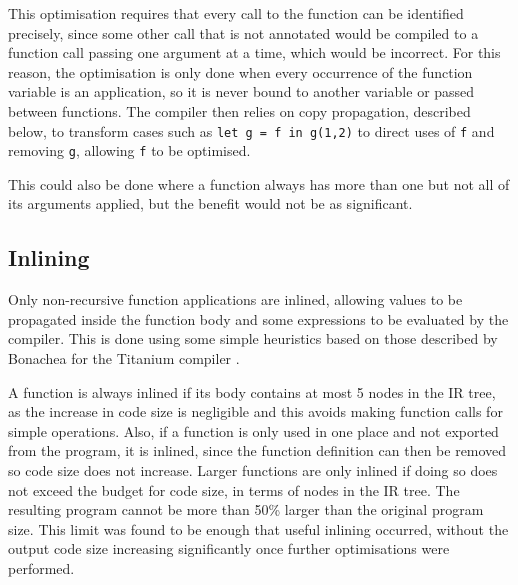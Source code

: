 
This optimisation requires that every call to the function can be identified precisely, since some other call that is not annotated would be compiled to a function call passing one argument at a time, which would be incorrect. For this reason, the optimisation is only done when every occurrence of the function variable is an application, so it is never bound to another variable or passed between functions. The compiler then relies on copy propagation, described below, to transform cases such as  \verb|let g = f in g(1,2)| to direct uses of \verb|f| and removing \verb|g|, allowing \verb|f| to be optimised. 

This could also be done where a function always has more than one but not all of its arguments applied, but the benefit would not be as significant.


\subsection{Inlining}
Only non-recursive function applications are inlined, allowing values to be propagated inside the function body and some expressions to be evaluated by the compiler. This is done using some simple heuristics based on those described by Bonachea for the Titanium compiler \cite{titanium}. 

A function is always inlined if its body contains at most 5 nodes in the IR tree, as the increase in code size is negligible and this avoids making function calls for simple operations. Also, if a function is only used in one place and not exported from the program, it is inlined, since the function definition can then be removed so code size does not increase.
Larger functions are only inlined if doing so does not exceed the budget for code size, in terms of nodes in the IR tree. The resulting program cannot be more than 50\% larger than the original program size.
This limit was found to be enough that useful inlining occurred, without the output code size increasing significantly once further optimisations were performed.

